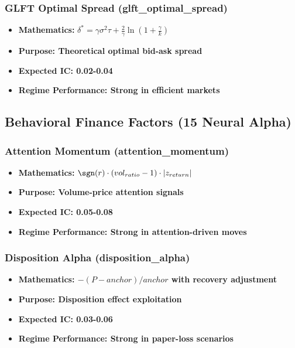 \documentclass[11pt,letterpaper,openany]{book}
\begin{document}
\subsubsection{GLFT Optimal Spread (glft\_optimal\_spread)}
\begin{itemize}
    \item \textbf{Mathematics:} $\delta^* = \gamma \sigma^2 \tau + \frac{2}{\gamma} \ln\left(1 + \frac{\gamma}{k}\right)$
    \item \textbf{Purpose: Theoretical optimal bid-ask spread}
    \item \textbf{Expected IC: 0.02-0.04}
    \item \textbf{Regime Performance: Strong in efficient markets}
\end{itemize}

\subsection{Behavioral Finance Factors (15 Neural Alpha)}

\subsubsection{Attention Momentum (attention\_momentum)}
\begin{itemize}
    \item \textbf{Mathematics:} $\sgn(r) \cdot (vol_{ratio} - 1) \cdot |z_{return}|$
    \item \textbf{Purpose: Volume-price attention signals}
    \item \textbf{Expected IC: 0.05-0.08}
    \item \textbf{Regime Performance: Strong in attention-driven moves}
\end{itemize}

\subsubsection{Disposition Alpha (disposition\_alpha)}
\begin{itemize}
    \item \textbf{Mathematics: $-(P - anchor) / anchor$ with recovery adjustment}
    \item \textbf{Purpose: Disposition effect exploitation}
    \item \textbf{Expected IC: 0.03-0.06}
    \item \textbf{Regime Performance: Strong in paper-loss scenarios}
\end{itemize}
\end{document}
